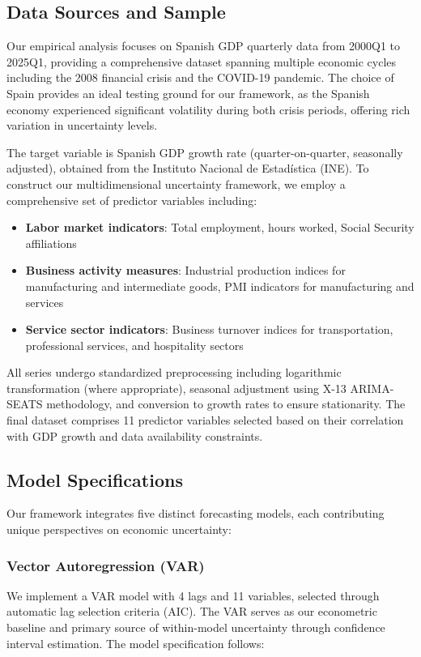 \documentclass[5p,authoryear]{elsarticle}
\begin{document}
\subsection{Data Sources and Sample}

Our empirical analysis focuses on Spanish GDP quarterly data from 2000Q1 to 2025Q1, providing a comprehensive dataset spanning multiple economic cycles including the 2008 financial crisis and the COVID-19 pandemic. The choice of Spain provides an ideal testing ground for our framework, as the Spanish economy experienced significant volatility during both crisis periods, offering rich variation in uncertainty levels.

The target variable is Spanish GDP growth rate (quarter-on-quarter, seasonally adjusted), obtained from the Instituto Nacional de Estadística (INE). To construct our multidimensional uncertainty framework, we employ a comprehensive set of predictor variables including:

\begin{itemize}
    \item \textbf{Labor market indicators}: Total employment, hours worked, Social Security affiliations
    \item \textbf{Business activity measures}: Industrial production indices for manufacturing and intermediate goods, PMI indicators for manufacturing and services
    \item \textbf{Service sector indicators}: Business turnover indices for transportation, professional services, and hospitality sectors
\end{itemize}

All series undergo standardized preprocessing including logarithmic transformation (where appropriate), seasonal adjustment using X-13 ARIMA-SEATS methodology, and conversion to growth rates to ensure stationarity. The final dataset comprises 11 predictor variables selected based on their correlation with GDP growth and data availability constraints.

\subsection{Model Specifications}

Our framework integrates five distinct forecasting models, each contributing unique perspectives on economic uncertainty:

\subsubsection{Vector Autoregression (VAR)}
We implement a VAR model with 4 lags and 11 variables, selected through automatic lag selection criteria (AIC). The VAR serves as our econometric baseline and primary source of within-model uncertainty through confidence interval estimation. The model specification follows:
\end{document}
